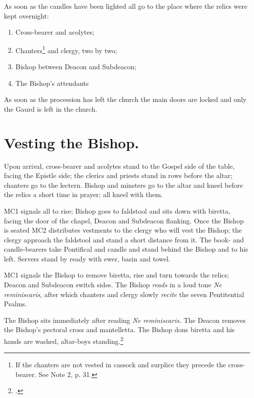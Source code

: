 \documentclass[letterpaper]{report}
\begin{document}
{\rubric As soon as the candles have been lighted all go to the place where the
relics were kept overnight:

\begin{enumerate}

    \item Cross-bearer and acolytes;

    \item Chanters\footnote{If the chanters are not vested in cassock and
        surplice they precede the cross-bearer. See \cite{consecranda} Note 2,
        p. 31.} and clergy, two by two;

    \item Bishop between Deacon and Subdeacon;

    \item The Bishop's attendants

\end{enumerate}

As soon as the procession has left the church the main doors are locked and
only the Gaurd is left in the church.

\section{Vesting the Bishop.}

\rubric Upon arrival, cross-bearer and acolytes stand to the Gospel side of the table, facing
the Epistle side; the clerics and priests stand in rows before the altar;
chanters go to the lectern. Bishop and minsters go to the altar and kneel before the
relics a short time in prayer; all kneel with them.

\rubric MC1 signals all to rise; Bishop goes to faldstool and sits down with
biretta, facing the door of the chapel, Deacon and Subdeacon flanking. Once the
Bishop is seated MC2 distributes vestments to the clergy who will vest the
Bishop; the clergy approach the faldstool and stand a short distance from it.
The book- and candle-bearers take Pontifical and candle and stand behind the
Bishop and to his left. Servers stand by ready with ewer, basin and towel.

\rubric MC1 signals the Bishop to remove biretta, rise and turn towards the
relics; Deacon and Subdeacon switch sides. The Bishop \textit{reads} in a loud tone
\textit{Ne reminiscaris}, after which chanters and clergy slowly
\textit{recite} the seven Pentitential Psalms.

\rubric The Bishop sits immediately after reading \textit{Ne reminiscaris.} The
Deacon removes the Bishop's pectoral cross and mantelletta. The Bishop dons
biretta and his hands are washed, altar-boys standing.\footcite[See][note 1, p.
39.]{consecranda}

}
\end{document}
